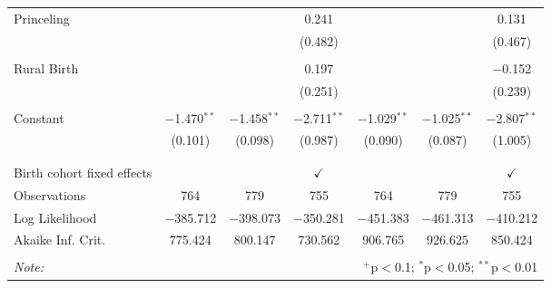 \documentclass[12pt,letterpaper]{article}
\begin{document}
\begin{table}[!htbp]
\begin{tabular}{@{\extracolsep{5pt}}lcccccc}
		Princeling &  &  & 0.241 &  &  & 0.131 \\ 
		&  &  & (0.482) &  &  & (0.467) \\ 
		& & & & & & \\ 
		Rural Birth &  &  & 0.197 &  &  & $-$0.152 \\ 
		&  &  & (0.251) &  &  & (0.239) \\ 
		& & & & & & \\ 
		Constant & $-$1.470$^{**}$ & $-$1.458$^{**}$ & $-$2.711$^{**}$ & $-$1.029$^{**}$ & $-$1.025$^{**}$ & $-$2.807$^{**}$ \\ 
		& (0.101) & (0.098) & (0.987) & (0.090) & (0.087) & (1.005) \\ 
		& & & & & & \\ 
		\hline \\[-1.8ex] 
		Birth cohort fixed effects &  &  & $\checkmark$ &  &  & $\checkmark$ \\ 
		Observations & 764 & 779 & 755 & 764 & 779 & 755 \\ 
		Log Likelihood & $-$385.712 & $-$398.073 & $-$350.281 & $-$451.383 & $-$461.313 & $-$410.212 \\ 
		Akaike Inf. Crit. & 775.424 & 800.147 & 730.562 & 906.765 & 926.625 & 850.424 \\ 
		\hline 
		\hline \\[-1.8ex] 
		\textit{Note:}  & \multicolumn{6}{r}{$^{+}$p$<$0.1; $^{*}$p$<$0.05; $^{**}$p$<$0.01}} \\ 
\end{tabular} 
\end{table} 
\end{document}
